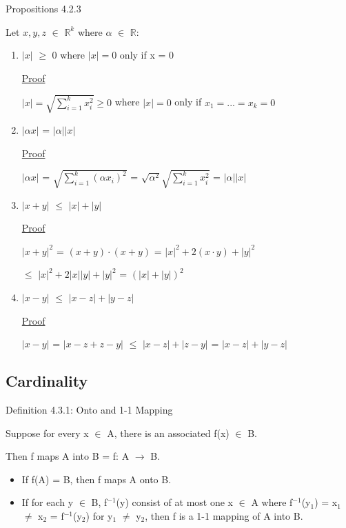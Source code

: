 \newpage

{ \color{blue} Propositions 4.2.3 } 

	\qquad Let $x,y,z$ $\in$ $\mathbb{R}^k$ where $\alpha$ $\in$ $\mathbb{R}$:
	\begin{enumerate}[label=(\alph*), leftmargin=2cm]
		\item $|x|$ $\geq$ 0 where $|x| = 0$ only if x = 0

			{ \color{magenta} \underline{Proof} } 
		
				$|x| = \sqrt{\sum_{i=1}^{k} x_i^2} \geq 0$ where $|x| = 0$ only if $x_1 = ... = x_k = 0$ 

		\item $|\alpha x|$ = $|\alpha| |x|$

			{ \color{magenta} \underline{Proof} } 
		
				$|\alpha x|$ = $\sqrt{\sum_{i=1}^k (\alpha x_i)^2}$
				= $\sqrt{\alpha^2} \sqrt{\sum_{i=1}^k x_i^2}$ = $|\alpha| |x|$
	
		\item $|x+y|$ $\leq$ $|x| + |y|$

			{ \color{magenta} \underline{Proof} } 
		
				$|x+y|^2$ = $(x+y) \cdot (x+y)$ = $|x|^2 + 2(x \cdot y) + |y|^2$

				$\leq$ $|x|^2 + 2|x||y| + |y|^2$ = $(|x|+|y|)^2$

		\item $|x-y|$ $\leq$ $|x-z| + |y-z|$

			{ \color{magenta} \underline{Proof} } 
		
				$|x-y|$ = $|x-z + z-y|$ $\leq$ $|x-z| + |z-y|$ = $|x-z| + |y-z|$
	\end{enumerate}





\subsection{Cardinality}

{ \color{blue} Definition 4.3.1: Onto and 1-1 Mapping } 

	\begin{adjustbox}{minipage=14cm, right}
		Suppose for every x $\in$ A, there is an associated f(x) $\in$ B.

		Then f maps A into B = f: A $\rightarrow$ B.
		\begin{itemize}[leftmargin=1cm]
			\item If f(A) = B, then f maps A onto B.
			
			\item If for each y $\in$ B, f$^{-1}$(y) consist of at most one x $\in$ A
				where f$^{-1}$(y$_1$) = x$_1$ $\neq$ x$_2$ = f$^{-1}$(y$_2$) for y$_1$ $\neq$ y$_2$,
				then f is a 1-1 mapping of A into B.
		\end{itemize}
	\end{adjustbox}

